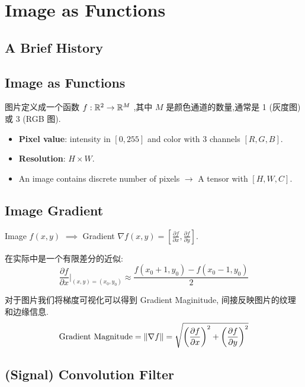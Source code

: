 \section{Image as Functions}
\label{sec:image_as_functions}

\subsection{A Brief History}

\subsection{Image as Functions}
图片定义成一个函数 $f: \mathbb{R}^2 \to \mathbb{R}^M$ ,其中 $M$ 是颜色通道的数量,通常是 1 (灰度图) 或 3 (RGB 图). 
\begin{itemize}
    \item \textbf{Pixel value}: intensity in $[0, 255]$ and color with 3 channels $[R, G, B]$.
    \item \textbf{Resolution}: $H \times W$. 
    \item An image contains discrete number of pixels $\to$ A tensor with $[H, W, C]$.
\end{itemize}

\subsection{Image Gradient}
Image $f(x, y)$ $\implies$ Gradient $\nabla f(x, y) = \left[ \frac{\partial f}{\partial x}, \frac{\partial f}{\partial y} \right]$.

在实际中是一个有限差分的近似:
\begin{equation}
    \frac{\partial f}{\partial x} \bigg|_{(x, y)=(x_0, y_0)} \approx \frac{f(x_0 + 1, y_0) - f(x_0 - 1, y_0)}{2}
\end{equation}

对于图片我们将梯度可视化可以得到 Gradient Maginitude, 间接反映图片的纹理和边缘信息.
\[
    \text{Gradient Magnitude} = \left \Vert \nabla f \right \Vert = \sqrt{\left( \frac{\partial f}{\partial x} \right)^2 + \left( \frac{\partial f}{\partial y} \right)^2}
\]

\subsection{(Signal) Convolution Filter}
